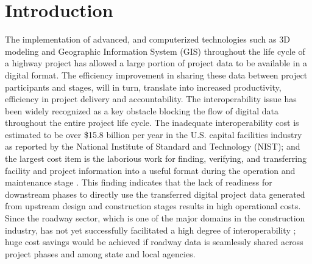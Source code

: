 \documentclass[Journal, BackFigs,NoLists, DoubleSpace]{ascelike}%
\begin{document}
%

\section{Introduction}%
%
The implementation of advanced, and computerized technologies such as 3D modeling and Geographic Information System (GIS) throughout the life cycle of a highway project has allowed a large portion of project data to be available in a digital format. The efficiency improvement in sharing these data between project participants and stages, will in turn, translate into increased productivity, efficiency in project delivery and accountability. The interoperability issue has been widely recognized as a key obstacle blocking the flow of digital data throughout the entire project life cycle. The inadequate interoperability cost is estimated to be over \$15.8 billion per year in the U.S. capital facilities industry as reported by the National Institute of Standard and Technology (NIST); and the largest cost item is the laborious work for finding, verifying, and transferring facility and project information into a useful format during the operation and maintenance stage \cite{Gallaher04}. This finding indicates that the lack of readiness for downstream phases to directly use the transferred digital project data generated from upstream design and construction stages results in high operational costs. Since the roadway sector, which is one of the major domains in the construction industry, has not yet successfully facilitated a high degree of interoperability \cite{lefler14}; huge cost savings would be achieved if roadway data is seamlessly shared across project phases and among state and local agencies.
%
\par
\end{document}
